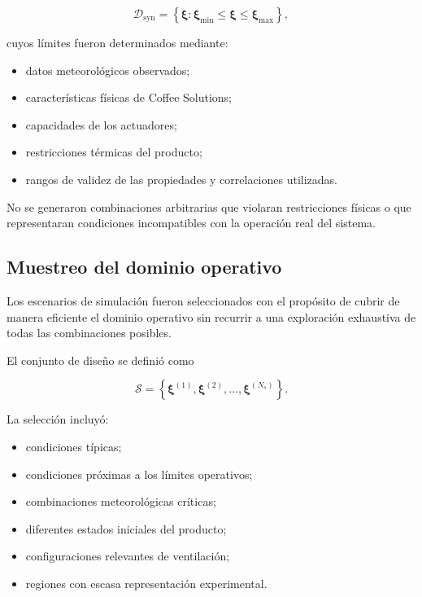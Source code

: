 \begin{equation}
\mathcal{D}_{\mathrm{syn}}
=
\left\{
\boldsymbol{\xi}:
\boldsymbol{\xi}_{\min}
\leq
\boldsymbol{\xi}
\leq
\boldsymbol{\xi}_{\max}
\right\},
\label{eq:dominio_simulado}
\end{equation}

cuyos límites fueron determinados mediante:

\begin{itemize}
    \item datos meteorológicos observados;
    \item características físicas de Coffee Solutions;
    \item capacidades de los actuadores;
    \item restricciones térmicas del producto;
    \item rangos de validez de las propiedades y correlaciones utilizadas.
\end{itemize}

No se generaron combinaciones arbitrarias que violaran restricciones físicas o que representaran condiciones incompatibles con la operación real del sistema.

\subsection{Muestreo del dominio operativo}
\label{subsec:muestreo_dominio_hibrido}

Los escenarios de simulación fueron seleccionados con el propósito de cubrir de manera eficiente el dominio operativo sin recurrir a una exploración exhaustiva de todas las combinaciones posibles.

El conjunto de diseño se definió como

\begin{equation}
\mathcal{S}
=
\left\{
\boldsymbol{\xi}^{(1)},
\boldsymbol{\xi}^{(2)},
\ldots,
\boldsymbol{\xi}^{(N_s)}
\right\}.
\end{equation}

La selección incluyó:

\begin{itemize}
    \item condiciones típicas;
    \item condiciones próximas a los límites operativos;
    \item combinaciones meteorológicas críticas;
    \item diferentes estados iniciales del producto;
    \item configuraciones relevantes de ventilación;
    \item regiones con escasa representación experimental.
\end{itemize}

